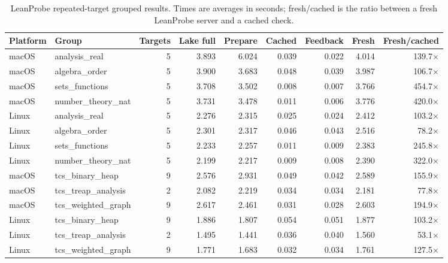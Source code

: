 \documentclass{article}
\begin{document}
\begin{table}[H]
\centering
\caption{LeanProbe repeated-target grouped results. Times are averages in seconds; fresh/cached is the ratio between a fresh LeanProbe server and a cached check.}
\label{tab:appendix-leanprobe-repeated}
\footnotesize
\setlength{\tabcolsep}{3pt}
\begin{tabular}{llrrrrrrr}
\toprule
Platform & Group & Targets & Lake full & Prepare & Cached & Feedback & Fresh & Fresh/cached \\
\midrule
macOS & analysis\_real & 5 & 3.893 & 6.024 & 0.039 & 0.022 & 4.014 & 139.7$\times$ \\
macOS & algebra\_order & 5 & 3.900 & 3.683 & 0.048 & 0.039 & 3.987 & 106.7$\times$ \\
macOS & sets\_functions & 5 & 3.708 & 3.502 & 0.008 & 0.007 & 3.766 & 454.7$\times$ \\
macOS & number\_theory\_nat & 5 & 3.731 & 3.478 & 0.011 & 0.006 & 3.776 & 420.0$\times$ \\
Linux & analysis\_real & 5 & 2.276 & 2.315 & 0.025 & 0.024 & 2.412 & 103.2$\times$ \\
Linux & algebra\_order & 5 & 2.301 & 2.317 & 0.046 & 0.043 & 2.516 & 78.2$\times$ \\
Linux & sets\_functions & 5 & 2.233 & 2.257 & 0.011 & 0.009 & 2.383 & 245.8$\times$ \\
Linux & number\_theory\_nat & 5 & 2.199 & 2.217 & 0.009 & 0.008 & 2.390 & 322.0$\times$ \\
\midrule
macOS & tcs\_binary\_heap & 9 & 2.576 & 2.931 & 0.049 & 0.042 & 2.589 & 155.9$\times$ \\
macOS & tcs\_treap\_analysis & 2 & 2.082 & 2.219 & 0.034 & 0.034 & 2.181 & 77.8$\times$ \\
macOS & tcs\_weighted\_graph & 9 & 2.617 & 2.461 & 0.031 & 0.028 & 2.603 & 194.9$\times$ \\
Linux & tcs\_binary\_heap & 9 & 1.886 & 1.807 & 0.054 & 0.051 & 1.877 & 103.2$\times$ \\
Linux & tcs\_treap\_analysis & 2 & 1.495 & 1.441 & 0.036 & 0.040 & 1.560 & 53.1$\times$ \\
Linux & tcs\_weighted\_graph & 9 & 1.771 & 1.683 & 0.032 & 0.034 & 1.761 & 127.5$\times$ \\
\bottomrule
\end{tabular}
\end{table}
\end{document}
